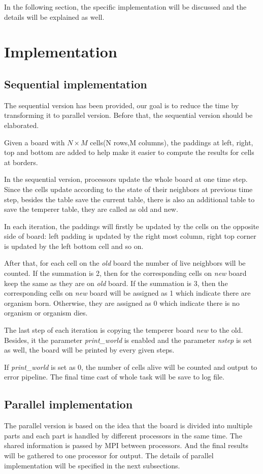 \documentclass[sigchi]{acmart}
\begin{document}
In the following section, the specific implementation will be discussed and the details will be explained as well.

\section{Implementation}
\subsection{Sequential implementation}
The sequential version has been provided, our goal is to reduce the time by transforming it to parallel version. 
Before that, the sequential version should be elaborated.

Given a board with $N \times M$ cells(N rows,M columns), the paddings at left, right, top and bottom are added to help make it easier to compute the results for cells at borders.

In the sequential version, processors update the whole board at one time step. 
Since the cells update according to the state of their neighbors at previous time step, besides the table save the current table, there is also an additional table to save the temperer table, they are called as old and new.

In each iteration, the paddings will firstly be updated by the cells on the opposite side of board: left padding is updated by the right most column, right top corner is updated by the left bottom cell and so on.

After that, for each cell on the \textit{old} board the number of live neighbors will be counted. If the summation is 2, then for the corresponding cells on \textit{new} board keep the same as they are on \textit{old} board. 
If the summation is 3, then the corresponding cells on \textit{new} board will be assigned as 1 which indicate there are organism born. Otherwise, they are assigned as 0 which indicate there is no organism or organism dies.

The last step of each iteration is copying the temperer board \textit{new} to the old. 
Besides, it the parameter \textit{print\_world} is enabled and the parameter \textit{nstep} is set as well, the board will be printed by every given steps.

If \textit{print\_world} is set as 0, the number of cells alive will be counted and output to error pipeline.
The final time cast of whole task will be save to log file.

\subsection{Parallel implementation}
The parallel version is based on the idea that the board is divided into multiple parts and each part is handled by different processors in the same time. 
The shared information is passed by MPI between processors. And the final results will be gathered to one processor for output. The details of parallel implementation will be specified in the next subsections.
\end{document}
